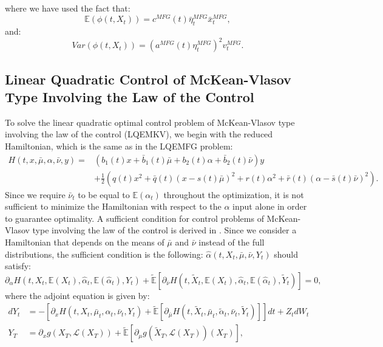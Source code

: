 \documentclass[11pt]{article}
\newcommand\cL{\mathcal L}
\begin{document}
where we have used the fact that:
\begin{equation*}
    \mathbb{E}(\phi(t,X_t))=c^{MFG}(t)\bar{\eta}_t^{MFG}\bar{x}_t^{MFG},
\end{equation*}
and:
\begin{equation*}
    Var(\phi(t,X_t))=(a^{MFG}(t)\eta_t^{MFG})^2v^{MFG}_t.
\end{equation*}

\subsection{\textbf{Linear Quadratic Control of McKean-Vlasov Type Involving the Law of the Control}}\label{sec:EMKV}
To solve the linear quadratic optimal control problem of McKean-Vlasov type involving the law of the control (LQEMKV), we begin with the reduced Hamiltonian, which is the same as in the LQEMFG problem:
\begin{equation*}
\begin{split}
    H(t,x,\bar{\mu},\alpha,\bar{\nu},y)=&(b_1(t)x+\bar{b}_1(t)\bar{\mu}+b_2(t) \alpha+\bar{b}_2(t)\bar{\nu})y\\
    &+\frac{1}{2}\left(q(t)x^2+\bar{q}(t)(x-s(t)\bar{\mu})^2 +r(t)\alpha^2+\bar{r}(t)(\alpha-\bar{s}(t)\bar{\nu})^2\right).
\end{split}
\end{equation*}
Since we require $\bar{\nu}_t$ to be equal to $\mathbb{E}(\alpha_t)$ throughout the optimization, it is not sufficient to minimize the Hamiltonian with respect to the $\alpha$ input alone in order to guarantee optimality. A sufficient condition for control problems of McKean-Vlasov type involving the law of the control is derived in \cite{cite_todo}. Since we consider a Hamiltonian that depends on the means of $\bar{\mu}$ and $\bar{\nu}$ instead of the full distributions, the sufficient condition is the following:
$\hat{\alpha}(t,X_t,\bar{\mu},\bar{\nu},Y_t)$ should satisfy:
\begin{equation*}
    \partial_{\alpha}H(t,X_t,\mathbb{E}(X_t),\hat{\alpha}_t,\mathbb{E}(\hat{\alpha}_t),Y_t)+\tilde{\mathbb{E}} \left[\partial_{\bar{\nu}}H(t,\tilde{X}_t,\mathbb{E}(X_t),\hat{\alpha}_t,\mathbb{E}(\hat{\alpha}_t),\tilde{Y}_t) \right]=0,
\end{equation*}
where the adjoint equation is given by:
\begin{equation*}
\begin{split}
    dY_t&=-\left[\partial_x H(t,X_t,\bar{\mu}_t,\alpha_t,\bar{\nu}_t,Y_t)+\tilde{\mathbb{E}} \left[\partial_{\bar{\mu}}H(t,\tilde{X}_t,\bar{\mu}_t,\tilde{\alpha}_t,\bar{\nu}_t,\tilde{Y}_t) \right] \right]dt+Z_tdW_t \\
    Y_T&=\partial_xg(X_T, \cL(X_T))+\tilde{\mathbb{E}} \left[\partial_{\mu}g(\tilde{X}_T,\cL(X_T))(X_T) \right],
\end{split}
\end{equation*}
\end{document}
